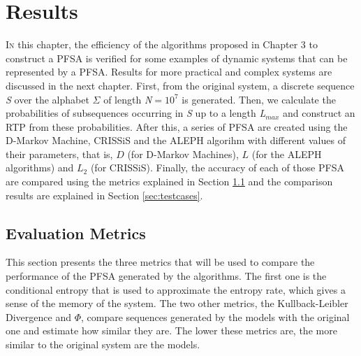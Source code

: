\chapter{Results}\label{cap:4}


{\lettrine[loversize=0.25,findent=0.2em,nindent=0em]{I}{n} this chapter, the efficiency of the algorithms proposed in Chapter 3 to construct a PFSA is verified for some examples of dynamic systems that can be represented by a PFSA. Results for more practical and complex systems are discussed in the next chapter. First, from the original system, a discrete sequence \textit{S} over the alphabet $\Sigma$ of length \textit{N}$=10^7$ is generated. Then, we calculate the probabilities of subsequences occurring in \textit{S} up to a length \textit{L}$_{max}$ and construct an RTP from these probabilities. After this, a series of PFSA are created using the D-Markov Machine, CRISSiS and the ALEPH algorihm with different values of their parameters, that is, $D$ (for D-Markov Machines), $L$ (for the ALEPH algorithms) and $L_2$ (for CRISSiS). Finally, the accuracy of each of those PFSA are compared using the metrics explained in Section \ref{sec:metrics} and the comparison results are explained in Section \ref{sec:testcases}.

\section{Evaluation Metrics}\label{sec:metrics}
%
%

This section presents the three metrics that will be used to compare the performance of the PFSA generated by the algorithms. The first one is the conditional entropy that is used to approximate the entropy rate, which gives a sense of the memory of the system. The two other metrics, the Kullback-Leibler Divergence and $\Phi$, compare sequences generated by the models with the original one and estimate how similar they are. The lower these metrics are, the more similar to the original system are the models.

}
